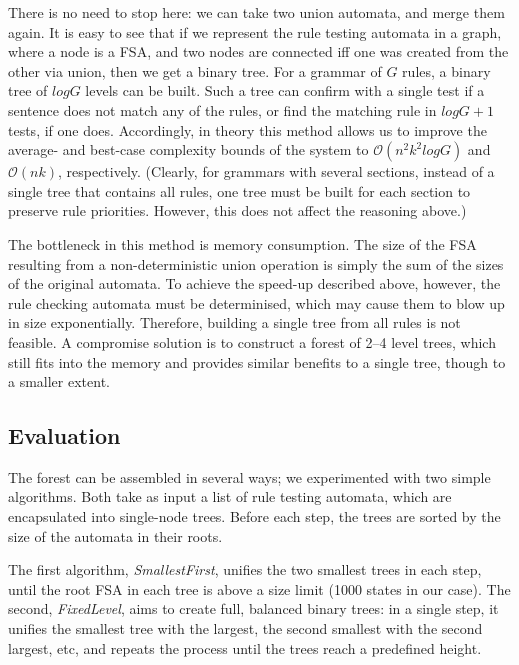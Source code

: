 \documentclass[11pt]{article}
\begin{document}
There is no need to stop here: we can take two union automata, and merge them
again. It is easy to see that if we represent the rule testing automata in a
graph, where a node is a FSA, and two nodes are connected iff one was created
from the other via union, then we get a binary tree. For a grammar of $G$ rules,
a binary tree of $logG$ levels can be built. Such a tree can confirm with a
single test if a sentence does not match any of the rules, or find the matching
rule in $logG + 1$ tests, if one does. Accordingly, in theory this method
allows us to improve the average- and best-case complexity bounds of the system
to $\mathcal{O}(n^2k^2logG)$ and $\mathcal{O}(nk)$, respectively.  %
(Clearly, for grammars with several sections, instead of a single tree that
contains all rules, one tree must be built for each section to preserve rule
priorities. However, this does not affect the reasoning above.)  %

The bottleneck in this method is memory consumption. The size of the FSA
resulting from a non-deterministic union operation is simply the sum of the
sizes of the original automata. To achieve the speed-up described above, however,
the rule checking automata must be determinised, which may cause them to blow up in size
exponentially. Therefore, building a single tree from all rules is not feasible.
A compromise solution is to construct a forest of 2--4 level trees, which still
fits into the memory and provides similar benefits to a single tree, though to
a smaller extent.

\subsection{Evaluation}

The forest can be assembled in several ways; we experimented with two simple
algorithms. Both take as input a list of rule testing automata, which are
encapsulated into single-node trees. Before each step, the trees are sorted by
the size of the automata in their roots.

The first algorithm, \textit{SmallestFirst}, unifies the two smallest trees in
each step, until the root FSA in each tree is above a size limit (1000 states in
our case).
The second, \textit{FixedLevel}, aims to create full, balanced binary trees:
in a single step, it unifies the smallest tree with the largest, the second
smallest with the second largest, etc, and repeats the process until the trees
reach a predefined height.
\end{document}
